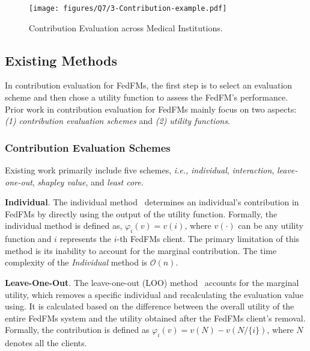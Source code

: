  
\begin{figure}[htb]
        \centering
        \texttt{[image: figures/Q7/3-Contribution-example.pdf]} %
        \caption{Contribution Evaluation across Medical Institutions.}
        \label{fig:Q3_Contribution_Example}
        \vspace{-15pt}
    \end{figure}
 





\subsection{Existing Methods}
In contribution evaluation for FedFMs, the first step is to select an evaluation scheme and then chose a utility function to assess the FedFM's performance.
Prior work in contribution evaluation for FedFMs mainly focus on two aspects: \textit{(1) contribution evaluation schemes} and \textit{(2) utility functions}.


\subsubsection{Contribution Evaluation Schemes}

Existing work primarily include five schemes, \textit{i.e.,} \textit{individual}, \textit{interaction}, \textit{leave-one-out}, \textit{shapley value}, and \textit{least core}.


\textbf{Individual}.
The individual method~\cite{Individual} determines an individual's contribution in FedFMs by directly using the output of the utility function.
Formally, the individual method is defined as, $\varphi_{i}(v) = v(i)$,  where $v(\cdot)$ can be any utility function and $i$ represents the $i${\small-th} FedFMs client.
The primary limitation of this method is its inability to account for the marginal contribution.
The time complexity of the \textit{Individual} method is $\mathcal{O}(n)$.


\textbf{Leave-One-Out}. 
The leave-one-out (LOO) method~\cite{LOO1999} accounts for the marginal utility, which removes a specific individual and recalculating the evaluation value using.
It is calculated based on the difference between the overall utility of the entire FedFMs system and the utility obtained after the FedFMs client's removal.
Formally, the contribution is defined as $\varphi_{i}(v) = v(N) - v(N/\{i\})$, where $N$ denotes all the clients.


